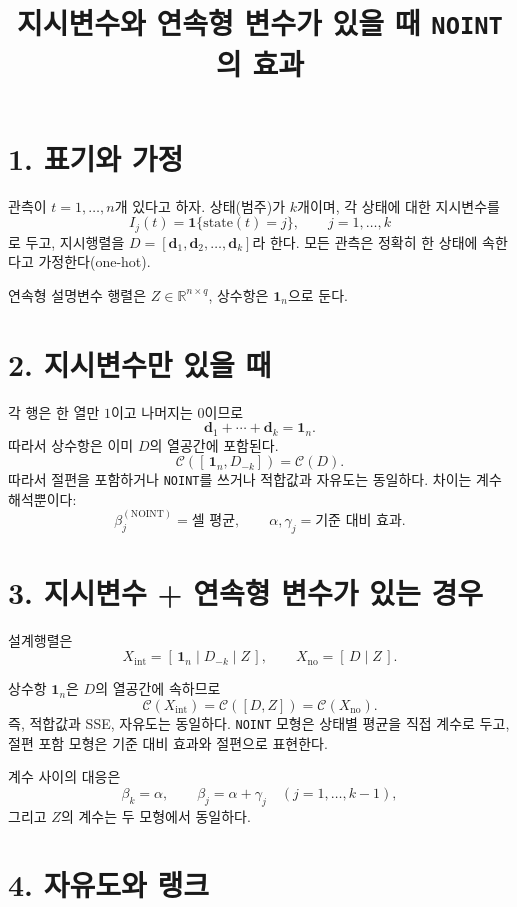 \documentclass[12pt]{article}
\title{지시변수와 연속형 변수가 있을 때 \texttt{NOINT}의 효과}
\author{}
\date{}
\begin{document}
\maketitle

\section*{1. 표기와 가정}

관측이 $t=1,\dots,n$개 있다고 하자. 상태(범주)가 $k$개이며, 각 상태에 대한 지시변수를
\[
I_j(t) = \mathbf{1}\{\text{state}(t)=j\}, \qquad j=1,\dots,k
\]
로 두고, 지시행렬을 $D = [\bm d_1, \bm d_2, \dots, \bm d_k]$라 한다.
모든 관측은 정확히 한 상태에 속한다고 가정한다(one-hot).

연속형 설명변수 행렬은 $Z \in \mathbb{R}^{n\times q}$, 상수항은 $\bm 1_n$으로 둔다.

\section*{2. 지시변수만 있을 때}

각 행은 한 열만 $1$이고 나머지는 $0$이므로
\[
\bm d_1 + \cdots + \bm d_k = \bm 1_n.
\]
따라서 상수항은 이미 $D$의 열공간에 포함된다.
\[
\mathcal C([\,\bm 1_n, D_{-k}]) = \mathcal C(D).
\]
따라서 절편을 포함하거나 \texttt{NOINT}를 쓰거나 적합값과 자유도는 동일하다.
차이는 계수 해석뿐이다:
\[
\beta_j^{(\text{NOINT})} = \text{셀 평균}, \qquad
\alpha, \gamma_j = \text{기준 대비 효과}.
\]

\section*{3. 지시변수 + 연속형 변수가 있는 경우}

설계행렬은
\[
X_{\mathrm{int}} = [\,\bm 1_n \;|\; D_{-k}\;|\; Z\,], \qquad
X_{\mathrm{no}} = [\,D\;|\;Z\,].
\]

상수항 $\bm 1_n$은 $D$의 열공간에 속하므로
\[
\mathcal C(X_{\mathrm{int}}) = \mathcal C([D, Z]) = \mathcal C(X_{\mathrm{no}}).
\]
즉, 적합값과 SSE, 자유도는 동일하다.
\texttt{NOINT} 모형은 상태별 평균을 직접 계수로 두고,
절편 포함 모형은 기준 대비 효과와 절편으로 표현한다.

계수 사이의 대응은
\[
\beta_k = \alpha, \qquad
\beta_j = \alpha + \gamma_j \quad (j=1,\dots,k-1),
\]
그리고 $Z$의 계수는 두 모형에서 동일하다.

\section*{4. 자유도와 랭크}
\end{document}
